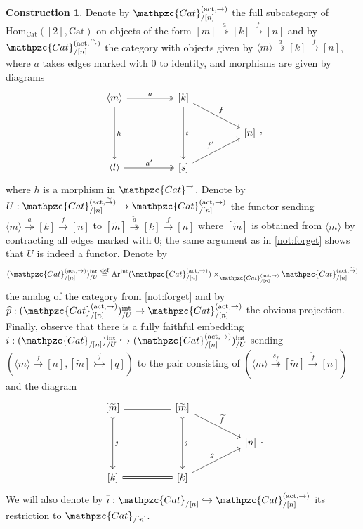 \documentclass[a4paper, reqno]{amsart}
\theoremstyle{definition}
\newtheorem{construction}[theorem]{Construction}
\newcommand\mor{\mathrm{Hom}}
\newcommand\cat{\mathrm{Cat}}
\newcommand\ccat{\mathpzc{Cat}}
\newcommand\arr{\mathrm{Ar}}
\newcommand\bydef{\overset{\mathrm{def}}{=}}
\newcommand\bm{\langle m\rangle}
\newcommand\bl{\langle l\rangle}
\newcommand\wrr{{\overset{\sim}{\rightarrow}}}
\newcommand\act{\mathrm{act}}
\newcommand\inrt{\mathrm{int}}
\begin{document}
\begin{construction}\label{constr:act_right}
Denote by $\ccat^{(\act,\rightarrow)}_{/[n]}$ the full subcategory of $\mor_\cat([2],\cat)$ on objects of the form $[m]\overset{a}{\twoheadrightarrow}[k]\xrightarrow{f}[n]$ and by $\ccat^{(\act,\wrr)}_{/[n]}$ the category with objects given by $\bm\overset{a}{\twoheadrightarrow}[k]\xrightarrow{f}[n]$, where $a$ takes edges marked with $0$ to identity, and morphisms are given by diagrams
\[
\begin{tikzcd}[column sep=huge]
\bm\arrow[r, two heads, "a"]\arrow[dd, "h"]&{[k]}\arrow[dd, "t"]\arrow[dr, "f"]\\
{}&{}&{[n]}\\
\bl\arrow[r, two heads, "a'"]&{[s]}\arrow[ur, "f'"]
\end{tikzcd},
\]
where $h$ is a morphism in $\ccat^\rightarrow$. Denote by $U:\ccat^{(\act,\wrr)}_{/[n]}\rightarrow\ccat^{(\act,\rightarrow)}_{/[n]}$ the functor sending $\bm\overset{a}{\twoheadrightarrow}[k]\xrightarrow{f}[n]$ to $[\widetilde{m}]\overset{\widetilde{a}}{\twoheadrightarrow}[k]\xrightarrow{f}[n]$ where $[\widetilde{m}]$ is obtained from $\bm$ by contracting all edges marked with $0$; the same argument as in \cref{not:forget} shows that $U$ is indeed a functor. Denote by \[(\ccat^{(\act,\rightarrow)}_{/[n]})^\inrt_{/U}\bydef \arr^\inrt(\ccat^{(\act,\rightarrow)}_{/[n]})\times_{\ccat^{(\act,\rightarrow)}_{/[n]}}\ccat^{(\act,\wrr)}_{/[n]}\]
the analog of the category from \cref{not:forget} and by $\widehat{p}:(\ccat^{(\act,\rightarrow)}_{/[n]})^\inrt_{/U}\rightarrow\ccat^{(\act,\rightarrow)}_{/[n]}$ the obvious projection. Finally, observe that there is a fully faithful embedding $i:(\ccat_{/[n]})^\inrt_{/U}\hookrightarrow(\ccat^{(\act,\rightarrow)}_{/[n]})^\inrt_{/U}$ sending $(\bm\xrightarrow{f}[n],[\widetilde{m}]\overset{j}{\rightarrowtail}[q])$ to the pair consisting of $(\bm\overset{s_f}{\twoheadrightarrow}[\widetilde{m}]\xrightarrow{\widetilde{f}}[n])$ and the diagram
\[
\begin{tikzcd}[column sep=huge]
{[\widetilde{m}]}\arrow[dd, tail, "j"]\arrow[r, equal]&{[\widetilde{m}]}\arrow[dr, "\widetilde{f}"]\arrow[dd, tail, "j"]\\
{}&{}&{[n]}\\
{[k]}\arrow[r, equal]&{[k]}\arrow[ur, "g"]
\end{tikzcd}.
\]
We will also denote by $\overline{i}:\ccat_{/[n]}\hookrightarrow\ccat^{(\act,\rightarrow)}_{/[n]}$ its restriction to $\ccat_{/[n]}$.
\end{construction}
\end{document}
